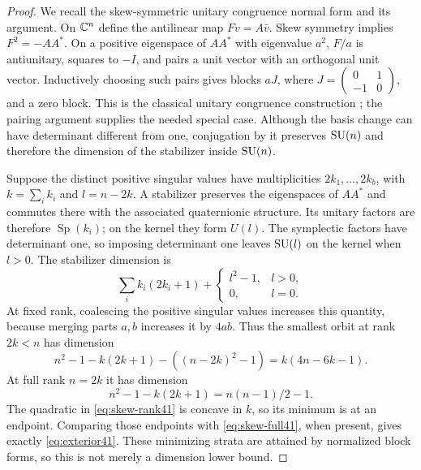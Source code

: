 \begin{proof}
We recall the skew-symmetric unitary congruence normal form and its
argument. On $\mathbb C^n$ define the antilinear map $Fv=A\bar v$.
Skew symmetry implies $F^2=-AA^*$. On a positive eigenspace of
$AA^*$ with eigenvalue $a^2$, $F/a$ is antiunitary, squares to $-I$,
and pairs a unit vector with an orthogonal unit vector. Inductively
choosing such pairs gives blocks $aJ$, where
$J=\left(\begin{smallmatrix}0&1\\-1&0\end{smallmatrix}\right)$,
and a zero block. This is the classical unitary congruence construction
\cite{Youla}; the pairing argument supplies the needed special case.
Although the basis change can have determinant different from one,
conjugation by it preserves $\operatorname{SU}(n)$ and therefore the dimension of
the stabilizer inside $\operatorname{SU}(n)$.

Suppose the distinct positive singular values have multiplicities
$2k_1,\ldots,2k_b$, with $k=\sum_i k_i$ and $l=n-2k$.
A stabilizer preserves the eigenspaces of $AA^*$ and commutes there
with the associated quaternionic structure. Its unitary factors are
therefore $\operatorname{Sp}(k_i)$; on the kernel they form $U(l)$.
The symplectic factors have determinant one, so imposing determinant
one leaves $\operatorname{SU}(l)$ on the kernel when $l>0$. The stabilizer dimension
is
\[
 \sum_i k_i(2k_i+1)+
 \begin{cases}l^2-1,&l>0,\\0,&l=0.\end{cases}
\]
At fixed rank, coalescing the positive singular values increases this
quantity, because merging parts $a,b$ increases it by $4ab$.
Thus the smallest orbit at rank $2k<n$ has dimension
\begin{equation}\label{eq:skew-rank41}
 n^2-1-k(2k+1)-((n-2k)^2-1)
                         =k(4n-6k-1).
\end{equation}
At full rank $n=2k$ it has dimension
\begin{equation}\label{eq:skew-full41}
                 n^2-1-k(2k+1)=n(n-1)/2-1.
\end{equation}
The quadratic in \eqref{eq:skew-rank41} is concave in $k$, so its
minimum is at an endpoint. Comparing those endpoints with
\eqref{eq:skew-full41}, when present, gives exactly
\eqref{eq:exterior41}. These minimizing strata are attained by
normalized block forms, so this is not merely a dimension lower bound.


\end{proof}

